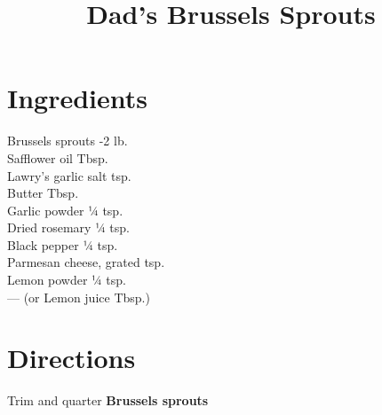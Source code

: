 \documentclass[11pt,letterpaper]{article}
\title{Dad's Brussels Sprouts}
\author{}
\date{}
\begin{document}
\maketitle
\thispagestyle{empty}

\section*{Ingredients}
\setlength{\columnsep}{20pt}
\begin{multicols}{2}
\noindent
    Brussels sprouts -2 lb. \\
    Safflower oil  Tbsp. \\
    Lawry's garlic salt  tsp. \\
    Butter  Tbsp. \\
    \columnbreak
    Garlic powder \dotfill ¼ tsp. \\
    Dried rosemary \dotfill ¼ tsp. \\
    Black pepper \dotfill ¼ tsp. \\
    Parmesan cheese, grated  tsp. \\
    Lemon powder \dotfill ¼ tsp. \\
    --- (or Lemon juice Tbsp.)
\end{multicols}

\section*{Directions}

\noindent
Trim and quarter \textbf{Brussels sprouts}
\end{document}
